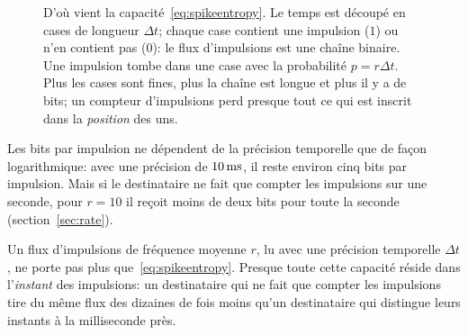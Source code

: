 \begin{figure}[t]
\centering
{}
\caption{D'où vient la capacité~\eqref{eq:spikeentropy}. Le temps est découpé en cases de longueur $\Delta t$; chaque case contient une impulsion ($1$) ou n'en contient pas ($0$): le flux d'impulsions est une chaîne binaire. Une impulsion tombe dans une case avec la probabilité $p=r\Delta t$. Plus les cases sont fines, plus la chaîne est longue et plus il y a de bits; un compteur d'impulsions perd presque tout ce qui est inscrit dans la \emph{position} des uns.}
\label{fig:cells}
\end{figure}

Les bits par impulsion ne dépendent de la précision temporelle que de façon logarithmique: avec une précision de $10\,\text{ms}$, il reste environ cinq bits par impulsion. Mais si le destinataire ne fait que compter les impulsions sur une seconde, pour $r=10$ il reçoit moins de deux bits pour toute la seconde (section~\ref{sec:rate}).

\begin{keyblock}
\begin{proposition}
\label{prop:capacity}
Un flux d'impulsions de fréquence moyenne $r$, lu avec une précision temporelle $\Delta t$, ne porte pas plus que~\eqref{eq:spikeentropy}. Presque toute cette capacité réside dans l'\emph{instant} des impulsions: un destinataire qui ne fait que compter les impulsions tire du même flux des dizaines de fois moins qu'un destinataire qui distingue leurs instants à la milliseconde près.
\end{proposition}
\end{keyblock}

